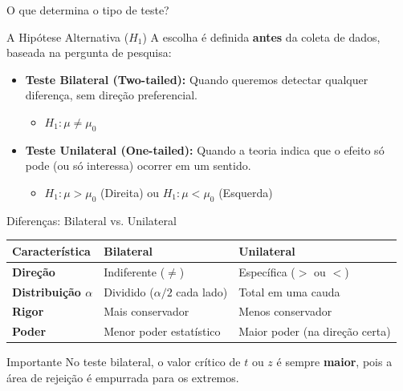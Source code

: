 \documentclass[aspectratio=169]{beamer}
\begin{document}
\begin{frame}{O que determina o tipo de teste?}
    \begin{block}{A Hipótese Alternativa ($H_1$)}
        A escolha é definida \textbf{antes} da coleta de dados, baseada na pergunta de pesquisa:
    \end{block}
    
    \begin{itemize}
        \item \textbf{Teste Bilateral (Two-tailed):} Quando queremos detectar qualquer diferença, sem direção preferencial.
        \begin{itemize}
            \item $H_1: \mu \neq \mu_0$
        \end{itemize}
        \vspace{0.3cm}
        \item \textbf{Teste Unilateral (One-tailed):} Quando a teoria indica que o efeito só pode (ou só interessa) ocorrer em um sentido.
        \begin{itemize}
            \item $H_1: \mu > \mu_0$ (Direita) ou $H_1: \mu < \mu_0$ (Esquerda)
        \end{itemize}
    \end{itemize}
\end{frame}

\begin{frame}{Diferenças: Bilateral vs. Unilateral}
    \begin{table}[]
        \small
        \begin{tabular}{|l|l|l|}
        \hline
        \textbf{Característica} & \textbf{Bilateral} & \textbf{Unilateral} \\ \hline
        \textbf{Direção} & Indiferente ($\neq$) & Específica ($>$ ou $<$) \\ \hline
        \textbf{Distribuição $\alpha$} & Dividido ($\alpha/2$ cada lado) & Total em uma cauda \\ \hline
        \textbf{Rigor} & Mais conservador & Menos conservador \\ \hline
        \textbf{Poder} & Menor poder estatístico & Maior poder (na direção certa) \\ \hline
        \end{tabular}
    \end{table}
    
    \begin{alertblock}{Importante}
        No teste bilateral, o valor crítico de $t$ ou $z$ é sempre \textbf{maior}, pois a área de rejeição é empurrada para os extremos.
    \end{alertblock}
\end{frame}
\end{document}
